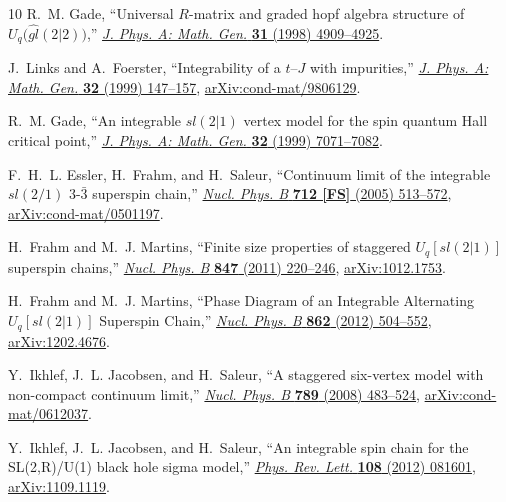 \documentclass[12pt]{article}
\numberwithin{equation}{section}
\begin{document}
\begin{thebibliography}{10}
		R.~M. Gade, ``Universal {$R$}-matrix and graded hopf algebra structure of
		${U_q(\widehat{gl}(2|2)})$,''
		\href{http://dx.doi.org/10.1088/0305-4470/31/21/009}{{\em J. Phys. A: Math.
				Gen.} {\bfseries 31} (1998) 4909--4925}.
		
		J.~Links and A.~Foerster, ``{I}ntegrability of a $t$--${J}$ with impurities,''
		\href{http://dx.doi.org/10.1088/0305-4470/32/1/016}{{\em J. Phys. A: Math.
				Gen.} {\bfseries 32} (1999) 147--157},
		\href{http://arxiv.org/abs/cond-mat/9806129}{{\ttfamily
				arXiv:cond-mat/9806129}}.
		
		R.~M. Gade, ``{A}n integrable $sl(2|1)$ vertex model for the spin quantum
		{H}all critical point,''
		\href{http://dx.doi.org/10.1088/0305-4470/32/41/303}{{\em J. Phys. A: Math.
				Gen.} {\bfseries 32} (1999) 7071--7082}.
		
		F.~H.~L. Essler, H.~Frahm, and H.~Saleur, ``{C}ontinuum limit of the integrable
		{$sl(2/1)$} {$3$-$\bar{3}$} superspin chain,''
		\href{http://dx.doi.org/10.1016/j.nuclphysb.2005.01.021}{{\em Nucl. Phys. B}
			{\bfseries 712 [FS]} (2005) 513--572},
		\href{http://arxiv.org/abs/cond-mat/0501197}{{\ttfamily
				arXiv:cond-mat/0501197}}.
		
		H.~Frahm and M.~J. Martins, ``{F}inite size properties of staggered
		${U}_q[sl(2|1)]$ superspin chains,''
		\href{http://dx.doi.org/10.1016/j.nuclphysb.2011.01.026}{{\em Nucl. Phys. B}
			{\bfseries 847} (2011) 220--246},
		\href{http://arxiv.org/abs/1012.1753}{{\ttfamily arXiv:1012.1753}}.
		
		H.~Frahm and M.~J. Martins, ``{P}hase {D}iagram of an {I}ntegrable
		{A}lternating ${U}_q[sl(2|1)]$ {S}uperspin {C}hain,''
		\href{http://dx.doi.org/https://doi.org/10.1016/j.nuclphysb.2012.04.019}{{\em
				Nucl. Phys. B} {\bfseries 862} (2012) 504--552},
		\href{http://arxiv.org/abs/1202.4676}{{\ttfamily arXiv:1202.4676}}.
		
		Y.~Ikhlef, J.~L. Jacobsen, and H.~Saleur, ``{A} staggered six-vertex model with
		non-compact continuum limit,''
		\href{http://dx.doi.org/https://doi.org/10.1016/j.nuclphysb.2007.07.004}{{\em
				Nucl. Phys. B} {\bfseries 789} (2008) 483--524},
		\href{http://arxiv.org/abs/cond-mat/0612037}{{\ttfamily
				arXiv:cond-mat/0612037}}.
		
		Y.~Ikhlef, J.~L. Jacobsen, and H.~Saleur, ``{A}n integrable spin chain for the
		{SL}(2,{R})/{U}(1) black hole sigma model,''
		\href{http://dx.doi.org/10.1103/PhysRevLett.108.081601}{{\em Phys. Rev.
				Lett.} {\bfseries 108} (2012) 081601},
		\href{http://arxiv.org/abs/1109.1119}{{\ttfamily arXiv:1109.1119}}.
		

\end{thebibliography}
\end{document}
